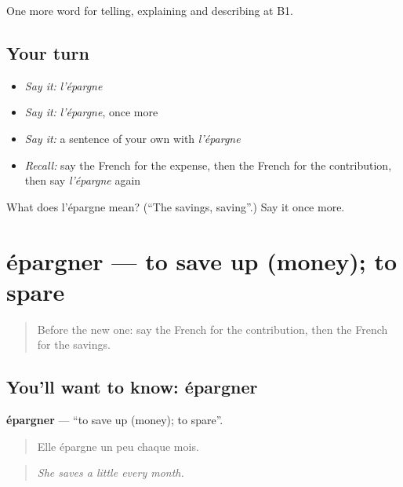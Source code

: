 \begin{grammarlens}[title={What you've built}]
One more word for telling, explaining and describing at B1.
\end{grammarlens}

\subsection*{Your turn}
\begin{itemize}
\raggedright
  \item \emph{Say it:} \emph{l'épargne}
  \item \emph{Say it:} \emph{l'épargne}, once more
  \item \emph{Say it:} a sentence of your own with \emph{l'épargne}
  \item \emph{Recall:} say the French for the expense, then the French for the contribution, then say \emph{l'épargne} again
\end{itemize}

\begin{tcolorbox}[breakable,colback=teal!4,colframe=teal!35!black,title={Before you move on}]
What does l'épargne mean? (\textquotedblleft{}The savings, saving\textquotedblright{}.) Say it once more.
\end{tcolorbox}
\section[épargner]{épargner — to save up (money); to spare}

\label{lesson:FR-C391-epargner}



\begin{quote}
Before the new one: say the French for the contribution, then the French for the savings.
\end{quote}

\subsection*{You'll want to know: épargner}
\textbf{épargner} — \textquotedblleft{}to save up (money); to spare\textquotedblright{}.

\begin{quote}
Elle épargne un peu chaque mois.
\end{quote}

\begin{quote}
\emph{She saves a little every month.}
\end{quote}

